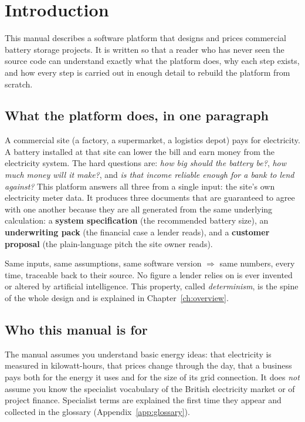 \chapter{Introduction}
\label{ch:intro}

This manual describes a software platform that designs and prices commercial battery storage projects. It is written so that a reader who has never seen the source code can understand exactly what the platform does, why each step exists, and how every step is carried out in enough detail to rebuild the platform from scratch.

\section{What the platform does, in one paragraph}

A commercial site (a factory, a supermarket, a logistics depot) pays for electricity. A battery installed at that site can lower the bill and earn money from the electricity system. The hard questions are: \emph{how big should the battery be?}, \emph{how much money will it make?}, and \emph{is that income reliable enough for a bank to lend against?} This platform answers all three from a single input: the site's own electricity meter data. It produces three documents that are guaranteed to agree with one another because they are all generated from the same underlying calculation: a \textbf{system specification} (the recommended battery size), an \textbf{underwriting pack} (the financial case a lender reads), and a \textbf{customer proposal} (the plain-language pitch the site owner reads).

\begin{keyidea}
Same inputs, same assumptions, same software version $\Rightarrow$ same numbers, every time, traceable back to their source. No figure a lender relies on is ever invented or altered by artificial intelligence. This property, called \emph{determinism}, is the spine of the whole design and is explained in Chapter~\ref{ch:overview}.
\end{keyidea}

\section{Who this manual is for}

The manual assumes you understand basic energy ideas: that electricity is measured in kilowatt-hours, that prices change through the day, that a business pays both for the energy it uses and for the size of its grid connection. It does \emph{not} assume you know the specialist vocabulary of the British electricity market or of project finance. Specialist terms are explained the first time they appear and collected in the glossary (Appendix~\ref{app:glossary}).

